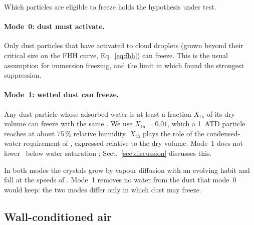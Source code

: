 Which particles are eligible to freeze holds the hypothesis under test.

\paragraph{Mode~0: dust must activate.} Only dust particles that have activated to cloud droplets (grown beyond their critical size on the FHH curve, Eq.~\ref{eq:fhh}) can freeze. This is the usual assumption for immersion freezing, and the limit in which \citet{Simpson2018} found the strongest suppression.

\paragraph{Mode~1: wetted dust can freeze.} Any dust particle whose adsorbed water is at least a fraction $X_\mathrm{th}$ of its dry volume can freeze with the same \ns. We use $X_\mathrm{th} = 0.01$, which a 1\um\ ATD particle reaches at about 75\,\% relative humidity. $X_\mathrm{th}$ plays the role of the condensed-water requirement of \citet{Simpson2018}, expressed relative to the dry volume. Mode~1 does not lower \ns\ below water saturation \citep{Koop2000,KnopfAlpert2013}; Sect.~\ref{sec:discussion} discusses this. 

In both modes the crystals grow by vapour diffusion with an evolving habit \citep{ChenLamb1994habit} and fall at the speeds of \citet{HeymsfieldWestbrook2010}. Mode~1 removes no water from the dust that mode~0 would keep: the two modes differ only in which dust may freeze.

\subsection{Wall-conditioned air}\label{sec:wall}

